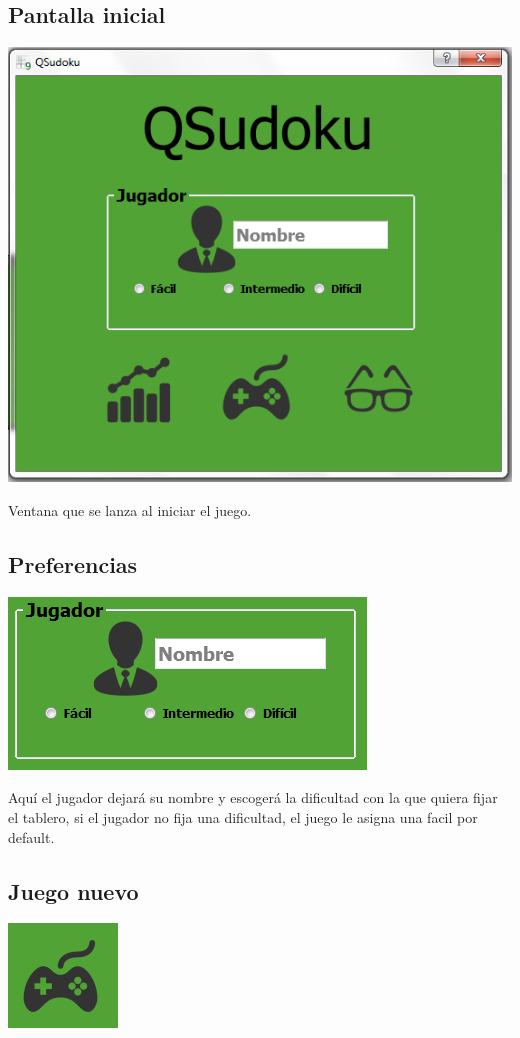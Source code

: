 \documentclass[a4paper,11pt]{article}
\begin{document}
\subsection{Pantalla inicial}
\includegraphics{inicio.png}

Ventana que se lanza al iniciar el juego.
\subsection{Preferencias}
\includegraphics{nombre.png}

Aquí el jugador dejará su nombre y escogerá la dificultad con la que quiera fijar el tablero, si el jugador no fija una dificultad, el juego le asigna una facil por default.
\subsection{Juego nuevo}
\includegraphics{nuevoICO.png}
\end{document}
